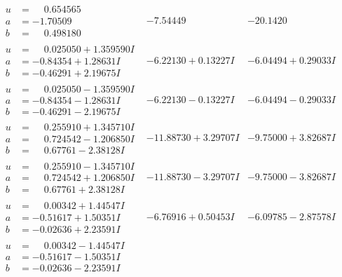 \documentclass[1p]{elsarticle_modified}
\theoremstyle{definition}
\begin{document}
$$\begin{array}{c|c|c}
\begin{aligned}
u &= \phantom{-}0.654565\phantom{ +0.000000I} \\
a &= -1.70509\phantom{ +0.000000I} \\
b &= \phantom{-}0.498180\phantom{ +0.000000I}\end{aligned}
 & -7.54449\phantom{ +0.000000I} & -20.1420\phantom{ +0.000000I} \\ \hline\begin{aligned}
u &= \phantom{-}0.025050 + 1.359590 I \\
a &= -0.84354 + 1.28631 I \\
b &= -0.46291 + 2.19675 I\end{aligned}
 & -6.22130 + 0.13227 I & -6.04494 + 0.29033 I \\ \hline\begin{aligned}
u &= \phantom{-}0.025050 - 1.359590 I \\
a &= -0.84354 - 1.28631 I \\
b &= -0.46291 - 2.19675 I\end{aligned}
 & -6.22130 - 0.13227 I & -6.04494 - 0.29033 I \\ \hline\begin{aligned}
u &= \phantom{-}0.255910 + 1.345710 I \\
a &= \phantom{-}0.724542 - 1.206850 I \\
b &= \phantom{-}0.67761 - 2.38128 I\end{aligned}
 & -11.88730 + 3.29707 I & -9.75000 + 3.82687 I \\ \hline\begin{aligned}
u &= \phantom{-}0.255910 - 1.345710 I \\
a &= \phantom{-}0.724542 + 1.206850 I \\
b &= \phantom{-}0.67761 + 2.38128 I\end{aligned}
 & -11.88730 - 3.29707 I & -9.75000 - 3.82687 I \\ \hline\begin{aligned}
u &= \phantom{-}0.00342 + 1.44547 I \\
a &= -0.51617 + 1.50351 I \\
b &= -0.02636 + 2.23591 I\end{aligned}
 & -6.76916 + 0.50453 I & -6.09785 - 2.87578 I \\ \hline\begin{aligned}
u &= \phantom{-}0.00342 - 1.44547 I \\
a &= -0.51617 - 1.50351 I \\
b &= -0.02636 - 2.23591 I\end{aligned}

\end{array}$$
\end{document}
